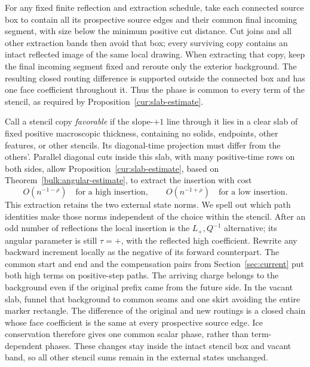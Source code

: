 For any fixed finite reflection and extraction schedule, take each
connected source box to contain all its prospective source edges and
their common final incoming segment, with size below the minimum
positive cut distance.  Cut joins and all other extraction bands then
avoid that box; every surviving copy contains an intact reflected
image of the same local drawing.  When extracting that copy, keep the
final incoming segment fixed and reroute only the exterior background.
The resulting closed routing difference is supported outside the
connected box and has one face coefficient throughout it.  Thus the
phase is common to every term of the stencil, as required by
Proposition~\ref{cur:slab-estimate}.

Call a stencil copy \emph{favorable} if the slope-$+1$ line through
it lies in a clear slab of fixed positive macroscopic thickness,
containing no solids, endpoints, other features, or other stencils.
Its diagonal-time projection must differ from the others'.  Parallel
diagonal cuts inside this slab, with many positive-time rows on both
sides, allow Proposition~\ref{cur:slab-estimate}, based on
Theorem~\ref{bulk:angular-estimate}, to extract the insertion with cost
\begin{equation}
 O(n^{-1-\rho})\quad\text{for a high insertion},\qquad
 O(n^{-1+\rho})\quad\text{for a low insertion}.
 \label{hol:angular-costs}
\end{equation}
This extraction retains the two external state norms.  We spell out
which path identities make those norms independent of the choice
within the stencil.  After an odd number of reflections the local
insertion is the $L_+,Q^{-1}$ alternative; its angular parameter is
still $\tau=+$, with the reflected high coefficient.  Rewrite any
backward increment locally as the negative of its forward counterpart.
The common start and end and the compensation pairs from
Section~\ref{sec:current} put both high terms on positive-step paths.
The arriving charge belongs to the background even if the original
prefix came from the future side.  In the vacant slab, funnel that
background to common seams and one skirt avoiding the entire marker
rectangle.  The difference of the original and new routings is a
closed chain whose face coefficient is the same at every prospective
source edge.  Ice conservation therefore gives one common scalar
phase, rather than term-dependent phases.  These changes stay inside
the intact stencil box and vacant band, so all other stencil sums
remain in the external states unchanged.

